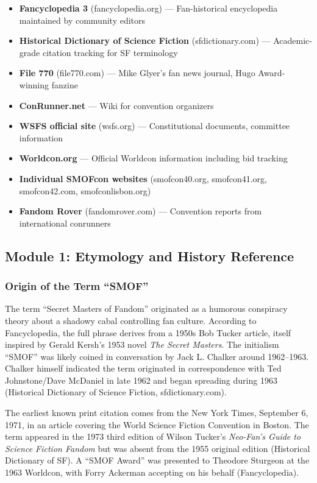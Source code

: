 \documentclass[11pt,letterpaper]{article}
\begin{document}
\begin{itemize}[leftmargin=2em]
\item \textbf{Fancyclopedia 3} (fancyclopedia.org) --- Fan-historical encyclopedia maintained by community editors
\item \textbf{Historical Dictionary of Science Fiction} (sfdictionary.com) --- Academic-grade citation tracking for SF terminology
\item \textbf{File 770} (file770.com) --- Mike Glyer's fan news journal, Hugo Award-winning fanzine
\item \textbf{ConRunner.net} --- Wiki for convention organizers
\item \textbf{WSFS official site} (wsfs.org) --- Constitutional documents, committee information
\item \textbf{Worldcon.org} --- Official Worldcon information including bid tracking
\item \textbf{Individual SMOFcon websites} (smofcon40.org, smofcon41.org, smofcon42.com, smofconlisbon.org)
\item \textbf{Fandom Rover} (fandomrover.com) --- Convention reports from international conrunners
\end{itemize}

\subsection{Module 1: Etymology and History Reference}

\subsubsection{Origin of the Term ``SMOF''}

The term ``Secret Masters of Fandom'' originated as a humorous conspiracy theory about a shadowy cabal controlling fan culture. According to Fancyclopedia, the full phrase derives from a 1950s Bob Tucker article, itself inspired by Gerald Kersh's 1953 novel \textit{The Secret Masters}. The initialism ``SMOF'' was likely coined in conversation by Jack L. Chalker around 1962--1963. Chalker himself indicated the term originated in correspondence with Ted Johnstone/Dave McDaniel in late 1962 and began spreading during 1963 (Historical Dictionary of Science Fiction, sfdictionary.com).

The earliest known print citation comes from the New York Times, September 6, 1971, in an article covering the World Science Fiction Convention in Boston. The term appeared in the 1973 third edition of Wilson Tucker's \textit{Neo-Fan's Guide to Science Fiction Fandom} but was absent from the 1955 original edition (Historical Dictionary of SF). A ``SMOF Award'' was presented to Theodore Sturgeon at the 1963 Worldcon, with Forry Ackerman accepting on his behalf (Fancyclopedia).
\end{document}
